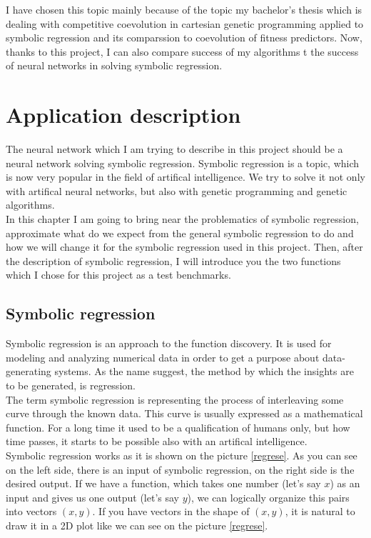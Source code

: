 \documentclass[a4paper,oneside,onecolumn,11pt]{report}
\begin{document}
	I have chosen this topic mainly because of the topic my bachelor's thesis which is dealing with competitive
	coevolution in cartesian genetic programming applied to symbolic regression and its comparssion
	to coevolution of fitness predictors. Now, thanks to this project, I can also compare success of
	my algorithms t the success of neural networks in solving symbolic regression.
	

\chapter{Application description}
	The neural network which I am trying to describe in this project should be a neural
	network solving symbolic regression. Symbolic regression is a topic, which is now very
	popular in the field of artifical intelligence. We try to solve it not only with
	artifical neural networks, but also with genetic programming and genetic algorithms.\\

	In this chapter I am going to bring near the problematics of symbolic regression, approximate
	what do we expect from the general symbolic regression to do and how we will change it
	for the symbolic regression used in this project. Then, after the description of symbolic
	regression, I will introduce you the two functions which I chose for this project as a 
	test benchmarks. 

	\section{Symbolic regression}
	Symbolic regression is an approach to the function discovery. It is used for modeling
	and analyzing numerical data in order to get a purpose about data-generating systems. 
	As the name suggest, the method by which the insights are to be generated, is regression.\\

	The term symbolic regression is representing the process of interleaving some curve through
	the known data. This curve is usually expressed as a mathematical function. For a long time
	it used to be a qualification of humans only, but how time passes, it starts to be possible
	also with an artifical intelligence.\\

	Symbolic regression works as it is shown on the picture \ref{regrese}. As you can see on the left
	side, there is an input of symbolic regression, on the right side is the desired output.
	If we have a function, which takes one number (let's say $x$) as an input and gives us one 
	output (let's say $y$), we can logically organize this pairs into vectors $(x, y)$. If you
	have vectors in the shape of $(x, y)$, it is natural to draw it in a 2D plot like we can see 
	on the picture \ref{regrese}.\\
\end{document}
